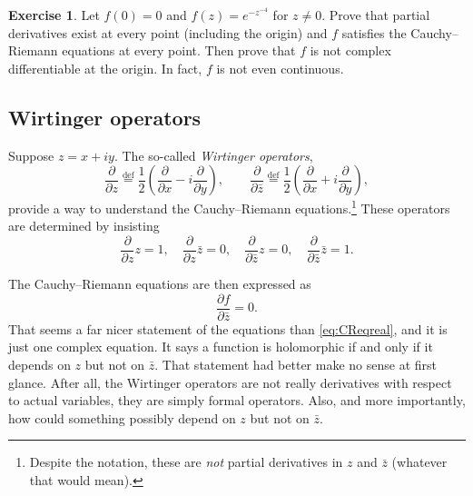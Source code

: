 \documentclass[12pt,openany]{book}
\newcommand{\myindex}[1]{#1\index{#1}}
\theoremstyle{plain}
\theoremstyle{remark}
\theoremstyle{definition}
\newenvironment{exbox}{%
    \def\FrameCommand{\vrule width 1pt \relax\hspace {10pt}}%
    \MakeFramed {\advance \hsize -\width \FrameRestore }%
}{%
    \endMakeFramed
}
\theoremstyle{exercise}
\newtheorem{exercise}{Exercise}[section]
\theoremstyle{example}
\begin{document}
\begin{exbox}
\begin{exercise}
Let $f(0) = 0$ and $f(z) = e^{-z^{-4}}$ for $z \not=0$.  Prove that partial
derivatives exist at every point (including the origin) and $f$
satisfies the Cauchy--Riemann equations at every point.
Then prove
that $f$ is not complex differentiable at the origin.  In fact, $f$ is not
even continuous.
\end{exercise}
\end{exbox}


\subsection{Wirtinger operators}

Suppose $z=x+iy$.
The so-called \emph{\myindex{Wirtinger operators}},
\begin{equation*}
\frac{\partial}{\partial z}
\overset{\text{def}}{=}
\frac{1}{2}
\left(
\frac{\partial}{\partial x} - i
\frac{\partial}{\partial y}
\right),
\qquad
\frac{\partial}{\partial \bar{z}}
\overset{\text{def}}{=}
\frac{1}{2}
\left(
\frac{\partial}{\partial x} + i
\frac{\partial}{\partial y}
\right)
,
\end{equation*}
provide a way to understand the
Cauchy--Riemann equations.\footnote{Despite the notation, these are
\emph{not} partial derivatives in $z$ and $\bar{z}$
(whatever that would mean).}
These operators are determined by insisting
%
\begin{equation*}
\frac{\partial}{\partial z} z = 1, \quad
\frac{\partial}{\partial z} \bar{z} = 0, \quad
\frac{\partial}{\partial \bar{z}} z = 0, \quad
\frac{\partial}{\partial \bar{z}} \bar{z} = 1.
\end{equation*}

The Cauchy--Riemann equations are then expressed as
\begin{equation} \label{eq:CReq}
\frac{\partial f}{\partial \bar{z}} = 0 .
\end{equation}
That seems a far nicer statement of the equations than \eqref{eq:CReqreal},
and it is just one complex equation.  
It says
a function is holomorphic if and only if it depends on $z$ but not on
$\bar{z}$.  That statement had better make no sense at first glance.
After all, the Wirtinger operators are not really derivatives with
respect to actual variables,
they are simply formal operators.
Also, and more importantly,
how could something possibly depend on $z$ but not on $\bar{z}$.
\end{document}
